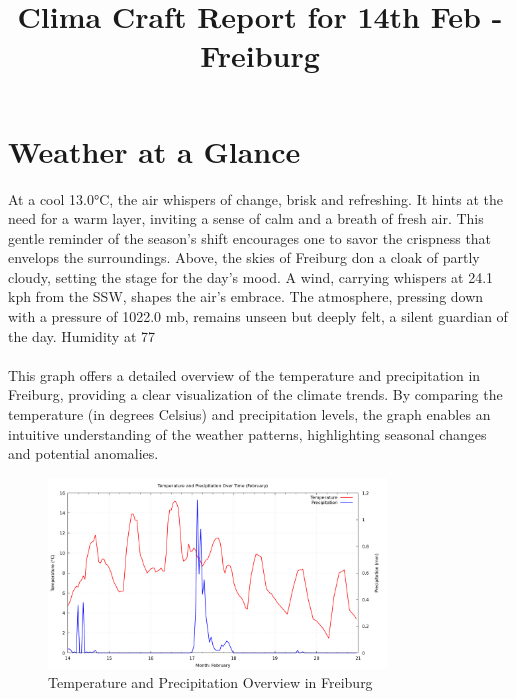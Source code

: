 \documentclass[11pt]{article}
\title{\textbf{\Huge Clima Craft Report for 14th Feb - Freiburg}}  %
\date{}
\begin{document}
    \maketitle

    \thispagestyle{fancy}
    \section*{Weather at a Glance }
At a cool 13.0°C, the air whispers of change, brisk and refreshing. It hints at the need for a warm layer, inviting a sense of calm and a breath of fresh air. This gentle reminder of the season's shift encourages one to savor the crispness that envelops the surroundings. Above, the skies of Freiburg don a cloak of partly cloudy, setting the stage for the day's mood. A wind, carrying whispers at 24.1 kph from the SSW, shapes the air's embrace. The atmosphere, pressing down with a pressure of 1022.0 mb, remains unseen but deeply felt, a silent guardian of the day. Humidity at 77%
\paragraph{}This graph offers a detailed overview of the temperature and precipitation in Freiburg, providing a clear visualization of the climate trends. By comparing the temperature (in degrees Celsius) and precipitation levels, the graph enables an intuitive understanding of the weather patterns, highlighting seasonal changes and potential anomalies.
\begin{figure}[h]
\centering
\includegraphics[width=0.8\textwidth]{data/graph/temperature_precipitation_graph.png}
\caption{Temperature and Precipitation Overview in Freiburg}
\end{figure}
\end{document}
